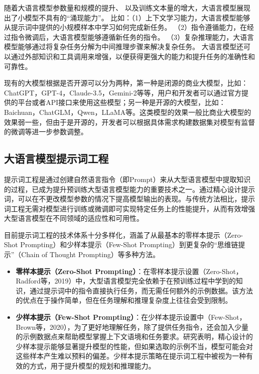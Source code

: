 随着大语言模型参数量和规模的提升、
以及训练文本量的增大，大语言模型展现出了小模型不具有的“涌现能力”。
比如：（1）上下文学习能力，大语言模型能够从提示词中提供的小规模样本中学习如何完成新任务。
（2）指令遵循能力，在经过指令微调后，大语言模型能够遵循新任务的指令。
（3）复杂推理能力，大语言模型能够通过将复杂任务分解为中间推理步骤来解决复杂任务。
大语言模型还可以通过外部知识和工具调用来增强，以便获得更强大的能力和提升任务的准确性和可靠性。

现有的大模型根据是否开源可以分为两种，第一种是闭源的商业大模型，比如：ChatGPT，GPT-4\cite{OpenAI2023}，Claude-3.5，Gemini-2等等，用户和开发者可以通过官方提供的平台或者API接口来使用这些模型；另一种是开源的大模型，比如：Baichuan\cite{Yang2023}，ChatGLM\cite{Zeng2023}，Qwen，LLaMA\cite{Touvron2023}等。这类模型的效果一般比商业大模型的效果弱一些，但由于是开源的，开发者可以根据具体需求构建数据集对模型有监督的微调等进一步参数调整。

\subsection{大语言模型提示词工程}

提示词工程是通过创建自然语言指令（即Prompt）来从大型语言模型中提取知识的过程，已成为提升预训练大型语言模型能力的重要技术之一。通过精心设计提示词，可以在不更改模型参数的情况下提高模型输出的表现。与传统方法相比，提示词工程无需对模型进行训练或微调即可实现特定任务上的性能提升，从而有效增强大型语言模型在不同领域的适应性和可用性。

目前提示词工程的技术体系十分多样化，涵盖了从最基本的零样本提示（Zero-Shot Prompting）和少样本提示（Few-Shot Prompting）到更复杂的“思维链提示”（Chain of Thought Prompting）等多种方法。

\begin{itemize}
    \item \textbf{零样本提示（Zero-Shot Prompting）}：在零样本提示设置（Zero-Shot，Radford等，2019）中，大型语言模型完全依赖于在预训练过程中学到的知识，通过提示词中的指令直接执行任务，而无需任何额外的示例数据。该方法的优点在于操作简单，但在任务理解和推理复杂度上往往会受到限制。
    \item \textbf{少样本提示（Few-Shot Prompting）}：在少样本提示设置中（Few-Shot，Brown等，2020），为了更好地理解任务，除了提供任务指令，还会加入少量的示例数据点来帮助模型掌握上下文语境和任务要求。研究表明，精心设计的少样本提示能够显著提升模型的性能，但如果选取的示例不当，模型可能会对这些样本产生难以预料的偏差。少样本提示策略在提示词工程中被视为一种有效的方式，用于提升模型的规划和推理能力。
\end{itemize}

